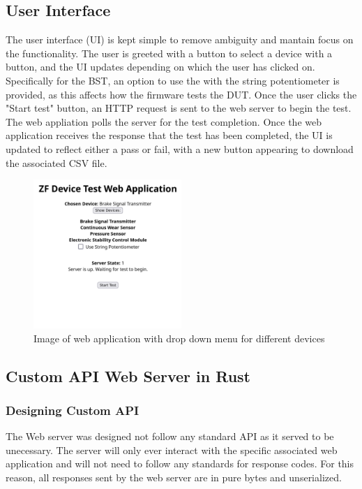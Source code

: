 \documentclass[12pt]{article}
\begin{document}
\subsection{User Interface}
The user interface (UI) is kept simple to remove ambiguity and mantain focus on the functionality. 
The user is greeted with a button to select a device with a button, and the UI updates depending on which the
user has clicked on. Specifically for the BST, an option to use the with the string potentiometer is provided, as this
affects how the firmware tests the DUT. Once the user clicks the "Start test" button, an HTTP request is sent
to the web server to begin the test. The web appliation polls the server for the test completion. Once the web application receives 
the response that the test has been completed, the UI is updated to reflect either a pass or fail, with a new button
appearing to download the associated CSV file.

\begin{figure}[H]
  \centering
  \includegraphics[width=0.5\textwidth]{../assets/webapp.png}
  \caption{Image of web application with drop down menu for different devices}
\end{figure}

\subsection{Custom API Web Server in Rust}
\subsubsection{Designing Custom API}
The Web server was designed not follow any standard API as it served to be unecessary. The server will only ever interact with
the specific associated web application and will not need to follow any standards for response codes. For this reason, all responses
sent by the web server are in pure bytes and unserialized.
\end{document}
